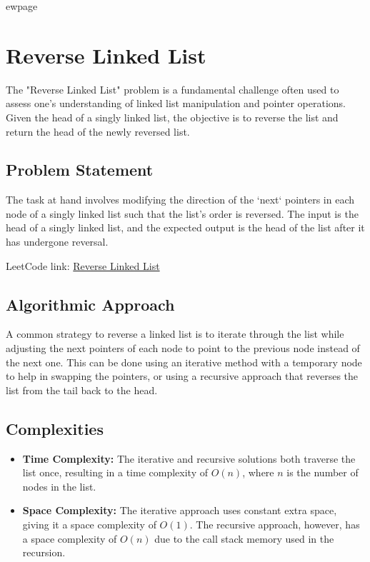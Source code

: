 
ewpage

\chapter{Reverse Linked List}
\label{chap:Reverse_Linked_List}
The "Reverse Linked List" problem is a fundamental challenge often used to assess one's understanding of linked list manipulation and pointer operations. Given the head of a singly linked list, the objective is to reverse the list and return the head of the newly reversed list.

\section*{Problem Statement}
The task at hand involves modifying the direction of the `next` pointers in each node of a singly linked list such that the list's order is reversed. The input is the head of a singly linked list, and the expected output is the head of the list after it has undergone reversal.

LeetCode link: \href{https://leetcode.com/problems/reverse-linked-list/}{Reverse Linked List}

\section*{Algorithmic Approach}
A common strategy to reverse a linked list is to iterate through the list while adjusting the next pointers of each node to point to the previous node instead of the next one. This can be done using an iterative method with a temporary node to help in swapping the pointers, or using a recursive approach that reverses the list from the tail back to the head.

\section*{Complexities}
\begin{itemize}
	\item \textbf{Time Complexity:} The iterative and recursive solutions both traverse the list once, resulting in a time complexity of \(O(n)\), where \(n\) is the number of nodes in the list.
	\item \textbf{Space Complexity:} The iterative approach uses constant extra space, giving it a space complexity of \(O(1)\). The recursive approach, however, has a space complexity of \(O(n)\) due to the call stack memory used in the recursion.
\end{itemize}


